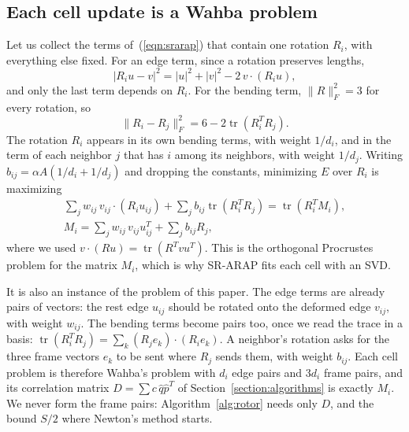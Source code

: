 \documentclass{birkjour}
\theoremstyle{definition}
\theoremstyle{remark}
\numberwithin{equation}{section}
\newcommand{\tr}{\operatorname{tr}}
\begin{document}
\subsection{Each cell update is a Wahba problem}

Let us collect the terms of~(\ref{eqn:srarap}) that contain one rotation $R_i$, with everything else fixed. For an edge term, since a rotation preserves lengths,
\[
|R_i u - v|^2 = |u|^2 + |v|^2 - 2\, v \cdot (R_i u),
\]
and only the last term depends on $R_i$. For the bending term, $\|R\|_F^2 = 3$ for every rotation, so
\[
\| R_i - R_j \|_F^2 = 6 - 2 \tr(R_i^T R_j).
\]
The rotation $R_i$ appears in its own bending terms, with weight $1/d_i$, and in the term of each neighbor $j$ that has $i$ among its neighbors, with weight $1/d_j$. Writing $b_{ij} = \alpha A (1/d_i + 1/d_j)$ and dropping the constants, minimizing $E$ over $R_i$ is maximizing
\begin{gather}
\sum_{j} w_{ij}\, v_{ij} \cdot (R_i u_{ij}) + \sum_j b_{ij} \tr(R_i^T R_j) = \tr(R_i^T M_i), \nonumber \\
\label{eqn:cell_gain}
M_i = \sum_j w_{ij}\, v_{ij} u_{ij}^T + \sum_j b_{ij} R_j,
\end{gather}
where we used $v \cdot (R u) = \tr(R^T v u^T)$. This is the orthogonal Procrustes problem for the matrix $M_i$, which is why SR-ARAP fits each cell with an SVD.

It is also an instance of the problem of this paper. The edge terms are already pairs of vectors: the rest edge $u_{ij}$ should be rotated onto the deformed edge $v_{ij}$, with weight $w_{ij}$. The bending terms become pairs too, once we read the trace in a basis: $\tr(R_i^T R_j) = \sum_k (R_j e_k) \cdot (R_i e_k)$. A neighbor's rotation asks for the three frame vectors $e_k$ to be sent where $R_j$ sends them, with weight $b_{ij}$. Each cell problem is therefore Wahba's problem with $d_i$ edge pairs and $3 d_i$ frame pairs, and its correlation matrix $D = \sum c\, \hat q \hat p^T$ of Section~\ref{section:algorithms} is exactly $M_i$. We never form the frame pairs: Algorithm~\ref{alg:rotor} needs only $D$, and the bound $S/2$ where Newton's method starts.
\end{document}
